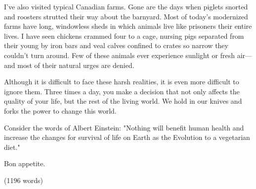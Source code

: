 \documentclass[a4paper]{article}
\begin{document}
I've also visited typical Canadian farms. Gone are the days when piglets snorted and roosters strutted their way about the barnyard. Most of today's modernized farms have long, windowless sheds in which animals live like prisoners their entire lives. I have seen chickens crammed four to a cage, nursing pigs separated from their young by iron bars and veal calves confined to crates so narrow they couldn't turn around. Few of these animals ever experience sunlight or fresh air---and most of their natural urges are denied. 

Although it is difficult to face these harsh realities, it is even more difficult to ignore them. Three times a day, you make a decision that not only affects the quality of your life, but the rest of the living world. We hold in our knives and forks the power to change this world.

Consider the words of Albert Einstein: "Nothing will benefit human health and increase the changes for survival of life on Earth as the Evolution to a vegetarian diet."

Bon appetite.

(1196 words)


\end{document}
